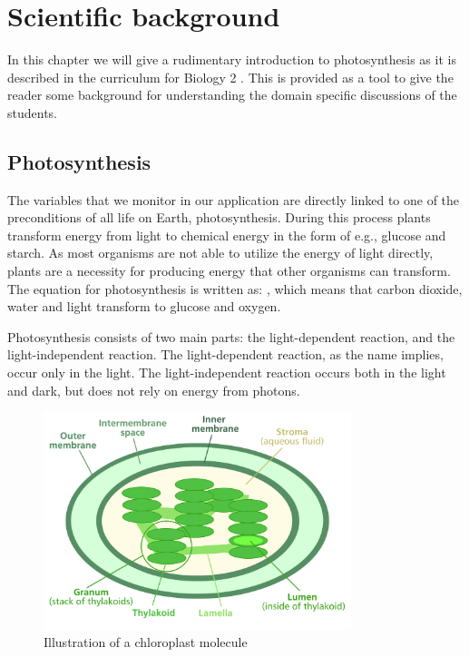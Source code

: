 \chapter{Scientific background}
\label{cha:scientificbg}
In this chapter we will give a rudimentary introduction to photosynthesis as it is described in the curriculum for Biology 2 \citep{bios}. This is provided as a tool to give the reader some background for understanding the domain specific discussions of the students.

\section{Photosynthesis}
The variables that we monitor in our application are directly linked to one of the preconditions of all life on Earth, photosynthesis. During this process plants transform energy from light to chemical energy in the form of e.g., glucose and starch. As most organisms are not able to utilize the energy of light directly, plants are a necessity for producing energy that other organisms can transform. The equation for photosynthesis is written as: , which means that carbon dioxide, water and light transform to glucose and oxygen.  

Photosynthesis consists of two main parts: the light-dependent reaction, and the light-independent reaction. The light-dependent reaction, as the name implies, occur only in the light. The light-independent reaction occurs both in the light and dark, but does not rely on energy from photons.  

\begin{figure}
\centering
\includegraphics[width=0.8\textwidth]{img/photosynthesis/Chloroplast_diagram.png}
\caption{Illustration of a chloroplast molecule \citep{wiki:chloroplast}}
\label{fig:chloroplast}
\end{figure}

